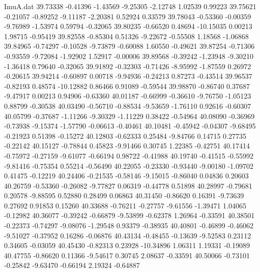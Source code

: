 \begin{filecontents}{ImuA.dat}
  39.73338   -0.41396   -1.43569   -9.25305   -2.12748    1.02539    0.99223
  39.75621   -0.21057   -0.89252   -9.11187   -2.20381    0.52924    0.33579
  39.78043   -0.53360   -0.00359   -9.76989   -1.53974    0.59794   -0.32065
  39.80235   -0.66520    0.48694  -10.15035    0.00213    1.98715   -0.95419
  39.82558   -0.85304    0.51326   -9.22672   -0.55508    1.18568   -1.06868
  39.84965   -0.74297   -0.10528   -9.73879   -0.60088    1.60550   -0.49621
  39.87254   -0.71306   -0.93559   -9.72084   -1.92902    1.52917   -0.00006
  39.89568   -0.39242   -1.23948   -9.30210   -1.36418    0.79640   -0.32065
  39.91892   -0.32303   -0.71426   -8.95992   -1.87559    0.26972   -0.20615
  39.94214   -0.60897    0.00718   -9.94936   -0.24213    0.87273   -0.43514
  39.96537   -0.82193    0.48574  -10.12882    0.86466    0.91089   -0.59544
  39.98870   -0.86740    0.37687   -9.47917    0.00213    0.94906   -0.63360
  40.01187   -0.66999   -0.36610   -9.76750   -1.05123    0.88799   -0.30538
  40.03490   -0.56710   -0.88534   -9.53659   -1.76110    0.92616   -0.60307
  40.05799   -0.37687   -1.11266   -9.30329   -1.11229    0.38422   -0.54964
  40.08090   -0.36969   -0.73938   -9.15374   -1.57790   -0.06613   -0.40461
  40.10481   -0.45942   -0.04307   -9.68495   -0.21923    0.51398   -0.15272
  40.12803   -0.62333    0.25484   -9.84766    0.14715    0.27735   -0.22142
  40.15127   -0.78844    0.45823   -9.91466    0.30745    1.22385   -0.42751
  40.17414   -0.75972   -0.27159   -9.61077   -0.66194    0.98722   -0.41988
  40.19740   -0.41515   -0.55992   -9.81416   -0.75354    0.55214   -0.56490
  40.22055   -0.23330   -0.93440   -9.00180   -1.09702    0.41475   -0.12219
  40.24406   -0.21535   -0.58146   -9.15015   -0.86040    0.04836    0.20603
  40.26759   -0.53360   -0.26082   -9.77827    0.06319   -0.44778    0.51898
  40.28997   -0.79681    0.20578   -9.88595    0.52880    0.28499    0.06863
  40.31450   -0.86620    0.16391   -9.73639    0.27692    0.91853    0.15260
  40.33688   -0.76211   -0.27757   -9.61556   -1.39471    1.04065   -0.12982
  40.36077   -0.39242   -0.66879   -9.53899   -0.62378    1.26964   -0.33591
  40.38501   -0.22373   -0.74297   -9.08076   -1.29548    0.93379   -0.38935
  40.40801   -0.46899   -0.46062   -9.51027   -0.37952    0.16286   -0.06876
  40.43134   -0.48455   -0.13639   -9.52583    0.23112    0.34605   -0.03059
  40.45430   -0.82313    0.23928  -10.34896    1.06311    1.19331   -0.19089
  40.47755   -0.86620    0.11366   -9.54617    0.30745    2.08637   -0.33591
  40.50066   -0.73101   -0.25842   -9.63470   -0.66194    2.19324   -0.64887

\end{filecontents}

